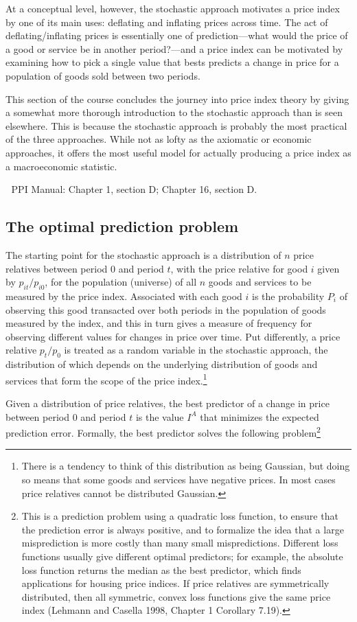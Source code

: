 \documentclass[]{article}
\begin{document}
At a conceptual level, however, the stochastic approach motivates a price index by one of its main uses: deflating and inflating prices across time. The act of deflating/inflating prices is essentially one of prediction---what would the price of a good or service be in another period?---and a price index can be motivated by examining how to pick a single value that bests predicts a change in price for a population of goods sold between two periods.

This section of the course concludes the journey into price index theory by giving a somewhat more thorough introduction to the stochastic approach than is seen elsewhere. This is because the stochastic approach is probably the most practical of the three approaches. While not as lofty as the axiomatic or economic approaches, it offers the most useful model for actually producing a price index as a macroeconomic statistic.

📖 PPI Manual: Chapter 1, section D; Chapter 16, section D.

\hypertarget{the-optimal-prediction-problem}{%
\subsection{The optimal prediction problem}\label{the-optimal-prediction-problem}}

The starting point for the stochastic approach is a distribution of \(n\) price relatives between period 0 and period \(t\), with the price relative for good \(i\) given by \(p_{it} / p_{i0}\), for the population (universe) of all \(n\) goods and services to be measured by the price index. Associated with each good \(i\) is the probability \(P_{i}\) of observing this good transacted over both periods in the population of goods measured by the index, and this in turn gives a measure of frequency for observing different values for changes in price over time. Put differently, a price relative \(p_{t} / p_{0}\) is treated as a random variable in the stochastic approach, the distribution of which depends on the underlying distribution of goods and services that form the scope of the price index.\footnote{There is a tendency to think of this distribution as being Gaussian, but doing so means that some goods and services have negative prices. In most cases price relatives cannot be distributed Gaussian.}

Given a distribution of price relatives, the best predictor of a change in price between period 0 and period \(t\) is the value \(I^{A}\) that minimizes the expected prediction error. Formally, the best predictor solves the following problem\footnote{This is a prediction problem using a quadratic loss function, to ensure that the prediction error is always positive, and to formalize the idea that a large misprediction is more costly than many small mispredictions. Different loss functions usually give different optimal predictors; for example, the absolute loss function returns the median as the best predictor, which finds applications for housing price indices. If price relatives are symmetrically distributed, then all symmetric, convex loss functions give the same price index (Lehmann and Casella 1998, Chapter 1 Corollary 7.19).}
\end{document}
